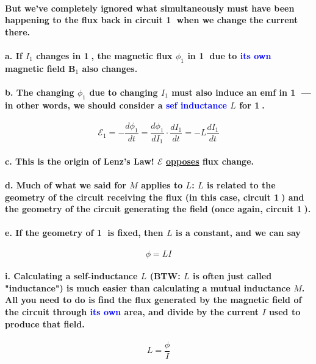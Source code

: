 \documentclass{article}
\begin{document}
\paragraph{\indent But we've completely ignored what simultaneously must have been happening to the flux back in circuit \textcircled{1} when we change the current there.}
\paragraph{\indent a. If $I_1$ changes in \textcircled{1}, the magnetic flux $\phi_1$ in \textcircled{1} due to \textcolor{blue}{its own} magnetic field $\boldsymbol{B}_1$ also changes.}
\paragraph{\indent b. The changing $\phi_1$ due to changing $I_1$ must also induce an emf in \textcircled{1} --- in other words, we should consider a \textcolor{blue}{sef inductance} $L$ for \textcircled{1}.}
\begin{equation*}
    \mathcal{E}_1=-\frac{d\phi_1}{dt}=\frac{d\phi_1}{dI_1}\cdot\frac{dI_1}{dt}=-L\frac{dI_1}{dt}
\end{equation*}
\paragraph{\indent c. This is the origin of Lenz's Law! $\mathcal{E}$ \underline{opposes} flux change.}
\paragraph{\indent d. Much of what we said for $M$ applies to $L$: $L$ is related to the geometry of the circuit receiving the flux (in this case, circuit \textcircled{1}) and the geometry of the circuit generating the field (once again, circuit \textcircled{1}).}
\paragraph{\indent e. If the geometry of \textcircled{1} is fixed, then $L$ is a constant, and we can say}
\begin{equation*}
    \phi=LI
\end{equation*}
\paragraph{\indent\indent i. Calculating a self-inductance $L$ (BTW: $L$ is often just called "inductance") is much easier than calculating a mutual inductance $M$. All you need to do is find the flux generated by the magnetic field of the circuit through \textcolor{blue}{its own} area, and divide by the current $I$ used to produce that field.}
\begin{equation*}
    L=\frac{\phi}{I}
\end{equation*}
\end{document}
